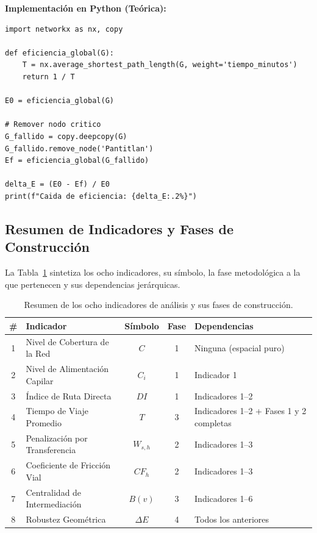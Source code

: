 \textbf{Implementación en Python (Teórica):}

\begin{lstlisting}[style=estiloPython, caption={Cálculo de Robustez Geométrica $\Delta E$ con NetworkX.}, label={lst:robustez}]
import networkx as nx, copy
 
def eficiencia_global(G):
    T = nx.average_shortest_path_length(G, weight='tiempo_minutos')
    return 1 / T
 
E0 = eficiencia_global(G)
 
# Remover nodo critico
G_fallido = copy.deepcopy(G)
G_fallido.remove_node('Pantitlan')
Ef = eficiencia_global(G_fallido)
 
delta_E = (E0 - Ef) / E0
print(f"Caida de eficiencia: {delta_E:.2%}")
\end{lstlisting}

 
\subsection{Resumen de Indicadores y Fases de Construcción}
\label{subsec:resumen-indicadores}

La Tabla~\ref{tab:resumen-indicadores} sintetiza los ocho indicadores, su símbolo,
la fase metodológica a la que pertenecen y sus dependencias jerárquicas.

\begin{table}[H]
    \centering
    \caption{Resumen de los ocho indicadores de análisis y sus fases de
             construcción.}
    \label{tab:resumen-indicadores}
    \begin{tabularx}{\textwidth}{c l c c X}
        \toprule
        \textbf{\#} & \textbf{Indicador} & \textbf{Símbolo} &
        \textbf{Fase} & \textbf{Dependencias} \\
        \midrule
        1 & Nivel de Cobertura de la Red     & $C$          & 1 & Ninguna (espacial puro) \\
        2 & Nivel de Alimentación Capilar    & $C_i$        & 1 & Indicador 1 \\
        3 & Índice de Ruta Directa           & $DI$         & 1 & Indicadores 1--2 \\
        4 & Tiempo de Viaje Promedio         & $T$          & 3 & Indicadores 1--2 + Fases 1 y 2 completas \\
        5 & Penalización por Transferencia   & $W_{s,h}$    & 2 & Indicadores 1--3 \\
        6 & Coeficiente de Fricción Vial     & $CF_h$       & 2 & Indicadores 1--3 \\
        7 & Centralidad de Intermediación    & $B(v)$       & 3 & Indicadores 1--6 \\
        8 & Robustez Geométrica              & $\Delta E$   & 4 & Todos los anteriores \\
        \bottomrule
    \end{tabularx}
\end{table}

